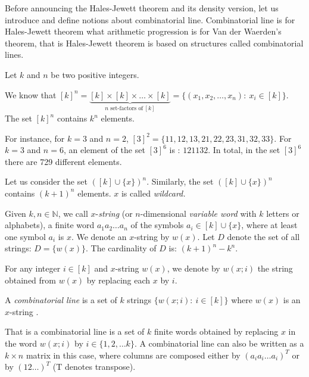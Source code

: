 Before announcing the Hales-Jewett theorem and its density version, let us introduce and define notions about combinatorial line.  Combinatorial line is for Hales-Jewett theorem what arithmetic progression is for Van der Waerden's theorem, that is Hales-Jewett theorem is based on structures called combinatorial lines.

Let $k$ and $n$  be two positive integers. 

We know that $[k]^n= \underbrace{[k] \times [k] \times \ldots \times [k]}_{n \text{ set-factors  of}\  [k]}=\{(x_1,x_2,\ldots, x_n):\ x_i \in [k] \}.$ The set $[k]^n$ contains $k^n$ elements.

For instance, for $k=3$ and $n=2$, $[3]^2=\{11,12,13,21,22,23,31,32,33\}.$ For $k=3$ and $n=6$, an element of the set $[3]^6$ is : $121132.$ In total, in the set $[3]^6$ there are  729 different elements.

Let us consider the set $([k]\cup \{x\})^n.$ Similarly, the set $([k]\cup \{x\})^n$ contains $(k+1)^n$ elements. $x$ is called \textit{wildcard.}

Given ${k,n\in{\mathbb N}}$, we call $x$-\textit{string} (or ${n}$-dimensional \textit{variable word} with ${k}$ letters or alphabets),  a finite word $a_1a_2\ldots a_n$ of the symbols
$a_i \in [k] \cup \{x\}$, where at least one symbol $a_i$ is $x.$ We denote an $x$-string by $w(x)$. Let $D$ denote  the set of all strings: $D=\{w(x)\}$. The cardinality of $D$ is: $(k+1)^n-k^n.$ 

For any integer $i \in [k]$ and $x$-string $w(x)$, we  denote by $w(x;i)$ the string obtained from $w(x)$ by replacing each $x$ by $i.$
 \begin{defn}
A \textit{combinatorial line} is a set of $k$ strings $\{w(x;i): \  i\in [k] \}$ where $w(x)$ is an $x$-string %
.\end{defn}
 That is a combinatorial line is a set of $k$ finite words obtained by replacing $x$ in the word $w(x;i)$ by $i \in \{1,2, \ldots k\}.$ A combinatorial line can also be written as a $k \times n$ matrix in this case, where columns are composed either by $(a_ia_i\ldots a_i)^T$ or by  $(12\ldots )^T$ (T denotes transpose).

